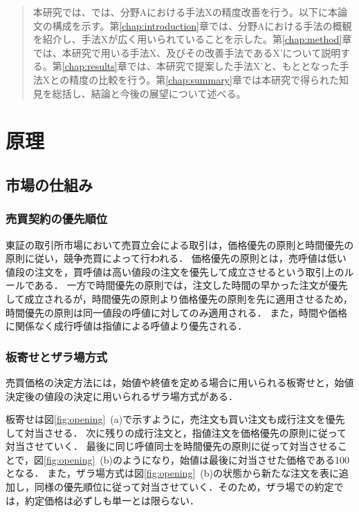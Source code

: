 \documentclass[titlepage]{jsreport}
\begin{document}
\begin{quotation}
    本研究では、では、分野Aにおける手法Xの精度改善を行う。以下に本論文の構成を示す。第\ref{chap:introduction}章では、分野Aにおける手法の概観を紹介し、手法Xが広く用いられていることを示した。第\ref{chap:method}章では、本研究で用いる手法X、及びその改善手法であるX'について説明する。第\ref{chap:results}章では、本研究で提案した手法X'と、もととなった手法Xとの精度の比較を行う。第\ref{chap:summary}章では本研究で得られた知見を総括し、結論と今後の展望について述べる。
\end{quotation}

\chapter{原理} \label{chap:principle}

\section{市場の仕組み}
\subsection{売買契約の優先順位}
東証の取引所市場において売買立会による取引は，価格優先の原則と時間優先の原則に従い，競争売買によって行われる\cite{shokengaimuin}．
価格優先の原則とは，売呼値は低い値段の注文を，買呼値は高い値段の注文を優先して成立させるという取引上のルールである．
一方で時間優先の原則では，注文した時間の早かった注文が優先して成立されるが，時間優先の原則より価格優先の原則を先に適用させるため，時間優先の原則は同一値段の呼値に対してのみ適用される．
また，時間や価格に関係なく成行呼値は指値による呼値より優先される．

\subsection{板寄せとザラ場方式}
売買価格の決定方法には，始値や終値を定める場合に用いられる板寄せと，始値決定後の値段の決定に用いられるザラ場方式がある\cite{shokengaimuin}．

板寄せは図\ref{fig:opening}~(a)で示すように，売注文も買い注文も成行注文を優先して対当させる．
次に残りの成行注文と，指値注文を価格優先の原則に従って対当させていく．
最後に同じ呼値同士を時間優先の原則に従って対当させることで，図\ref{fig:opening}~(b)のようになり，始値は最後に対当させた価格である100となる．
また，ザラ場方式は図\ref{fig:opening}~(b)の状態から新たな注文を表に追加し，同様の優先順位に従って対当させていく．そのため，ザラ場での約定では，約定価格は必ずしも単一とは限らない．
\end{document}
